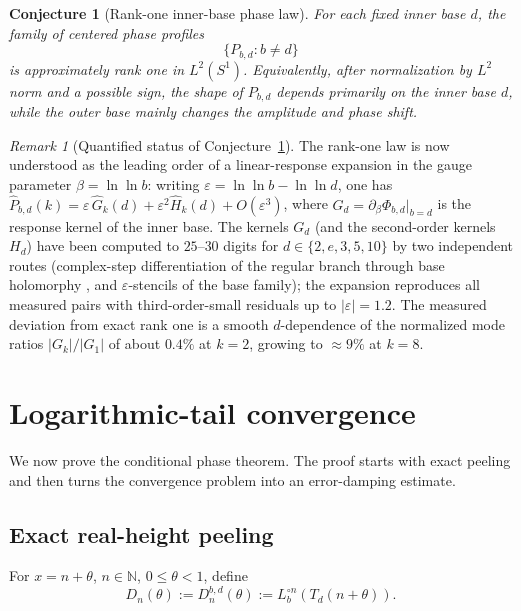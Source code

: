 \documentclass[11pt,a4paper]{article}
\theoremstyle{plain}
\newtheorem{conjecture}[theorem]{Conjecture}
\theoremstyle{definition}
\theoremstyle{remark}
\newtheorem{remark}[theorem]{Remark}
\newcommand{\N}{\mathbb{N}}
\begin{document}
\begin{conjecture}[Rank-one inner-base phase law]\label{conj:inner-base}
For each fixed inner base $d$, the family of centered phase profiles
\[
  \{P_{b,d}: b\neq d\}
\]
is approximately rank one in $L^2(S^1)$.  Equivalently, after normalization by $L^2$ norm and a possible sign, the shape of $P_{b,d}$ depends primarily on the inner base $d$, while the outer base mainly changes the amplitude and phase shift.
\end{conjecture}

\begin{remark}[Quantified status of Conjecture~\ref{conj:inner-base}]
The rank-one law is now understood as the leading order of a linear-response
expansion in the gauge parameter $\beta=\ln\ln b$: writing
$\varepsilon=\ln\ln b-\ln\ln d$, one has
$\widehat P_{b,d}(k)=\varepsilon\,\widehat G_k(d)+\varepsilon^2\widehat
H_k(d)+O(\varepsilon^3)$, where $G_d=\partial_\beta\Phi_{b,d}|_{b=d}$ is the
response kernel of the inner base.  The kernels $G_d$ (and the second-order
kernels $H_d$) have been computed to $25$--$30$ digits for
$d\in\{2,e,3,5,10\}$ by two independent routes (complex-step differentiation
of the regular branch through base holomorphy \cite{paulsen-complex-bases},
and $\varepsilon$-stencils of the base family); the expansion reproduces all
measured pairs with third-order-small residuals up to $|\varepsilon|=1.2$.
The measured deviation from exact rank one is a smooth $d$-dependence of the
normalized mode ratios $|G_k|/|G_1|$ of about $0.4\%$ at $k=2$, growing to
$\approx9\%$ at $k=8$.
\end{remark}

\section{Logarithmic-tail convergence}

We now prove the conditional phase theorem.  The proof starts with exact peeling and then turns the convergence problem into an error-damping estimate.

\subsection{Exact real-height peeling}

For $x=n+\theta$, $n\in\N$, $0\leq\theta<1$, define
\begin{equation}\label{eq:Dn-def}
  D_n(\theta):=D_n^{b,d}(\theta):=L_b^{\circ n}(T_d(n+\theta)).
\end{equation}
\end{document}
